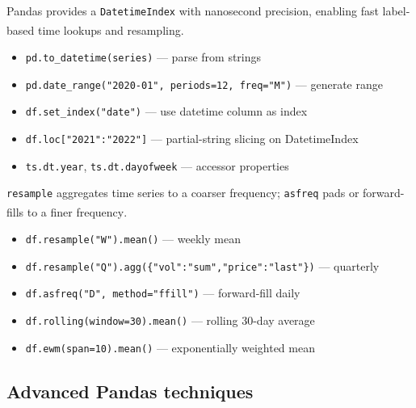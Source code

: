\begin{tcbitemize}[ skin=sectionraster ]
    \tcbitem[title={Date and Time in Pandas}, raster multicolumn=3]
    Pandas provides a \texttt{DatetimeIndex} with nanosecond precision, enabling fast label-based time lookups and resampling\textsuperscript{\cite{molinHandsonDataAnalysis2021}}.
    \tcblower
    \begin{itemize}
        \item \texttt{pd.to\_datetime(series)} --- parse from strings
        \item \texttt{pd.date\_range("2020-01", periods=12, freq="M")} --- generate range
        \item \texttt{df.set\_index("date")} --- use datetime column as index
        \item \texttt{df.loc["2021":"2022"]} --- partial-string slicing on DatetimeIndex
        \item \texttt{ts.dt.year}, \texttt{ts.dt.dayofweek} --- accessor properties
    \end{itemize}

    \tcbitem[title={Resampling and Frequency Conversion}, raster multicolumn=3]
    \texttt{resample} aggregates time series to a coarser frequency; \texttt{asfreq} pads or forward-fills to a finer frequency\textsuperscript{\cite{molinHandsonDataAnalysis2021}}.
    \tcblower
    \begin{itemize}
        \item \texttt{df.resample("W").mean()} --- weekly mean
        \item \texttt{df.resample("Q").agg(\{"vol":"sum","price":"last"\})} --- quarterly
        \item \texttt{df.asfreq("D", method="ffill")} --- forward-fill daily
        \item \texttt{df.rolling(window=30).mean()} --- rolling 30-day average
        \item \texttt{df.ewm(span=10).mean()} --- exponentially weighted mean
    \end{itemize}
\end{tcbitemize}

\subsection{Advanced Pandas techniques}


